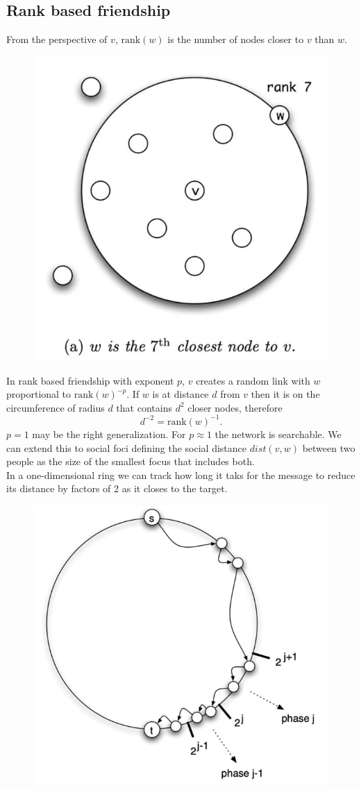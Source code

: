 \documentclass[a4paper,9pt]{extarticle}
\begin{document}
\begin{multicols*}{2}
		\subsection{Rank based friendship}
		From the perspective of $v$, $\mathrm{rank}(w)$ is the number of nodes closer to $v$ than $w$.
		\begin{figure}[H]
			\centering
			\includegraphics[width=0.7\linewidth]{screenshot005}
			\label{fig:screenshot005}
		\end{figure}
		In rank based friendship  with exponent $p$, $v$ creates a random link with $w$ proportional to $\mathrm{rank}(w)^{-p}$. If $w$ is at distance $d$ from $v$ then it is on the circumference of radius $d$ that contains $d^{2}$ closer nodes, therefore
		\begin{equation*}
			d^{-2}=\mathrm{rank}(w)^{-1}.
		\end{equation*}
		$p=1$ may be the right generalization. 
		For $p\approx 1$ the network is searchable. We can extend this to social foci defining the social distance $dist(v,w)$ between two people as the size of the smallest focus that includes both.\\
		In a one-dimensional ring we can track how long it taks for the message to reduce its distance by factors of 2 as it closes to the target.
		\begin{figure}[H]
			\centering
			\includegraphics[width=0.7\linewidth]{screenshot006}

\end{figure}
\end{multicols*}
\end{document}
